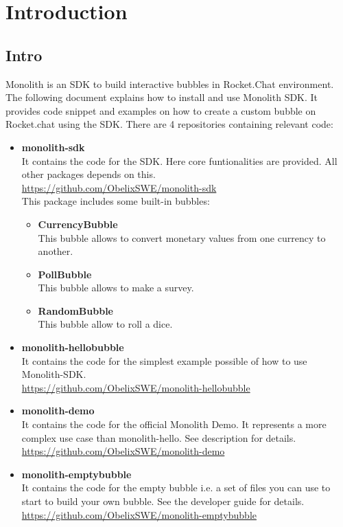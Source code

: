\section{Introduction}
\subsection{Intro}
Monolith is an SDK to build interactive bubbles in Rocket.Chat environment.
The following document explains how to install and use Monolith SDK.
It provides code snippet and examples on how to create a custom bubble on Rocket.chat using the SDK.
There are 4 repositories containing relevant code:
\begin{itemize}
\item \textbf{monolith-sdk}\\
It contains the code for the SDK. Here core funtionalities are provided. All other packages depends on this.\\
\url{https://github.com/ObelixSWE/monolith-sdk}\\
This package includes some built-in bubbles:
\begin{itemize}
\item \textbf{CurrencyBubble}\\
This bubble allows to convert monetary values from one currency to another.
\item \textbf{PollBubble}\\
This bubble allows to make a survey.
\item \textbf{RandomBubble}\\
This bubble allow to roll a dice.
\end{itemize}

\item \textbf{monolith-hellobubble}\\
It contains the code for the simplest example possible of how to use Monolith-SDK.\\
\url{https://github.com/ObelixSWE/monolith-hellobubble}
\item \textbf{monolith-demo}\\
It contains the code for the official Monolith Demo. It represents a more complex use case than monolith-hello. See description for details.\\
\url{https://github.com/ObelixSWE/monolith-demo}
\item \textbf{monolith-emptybubble}\\
It contains the code for the empty bubble i.e. a set of files you can use to start to build your own bubble. See the developer guide for details.\\
\url{https://github.com/ObelixSWE/monolith-emptybubble}
\end{itemize}

